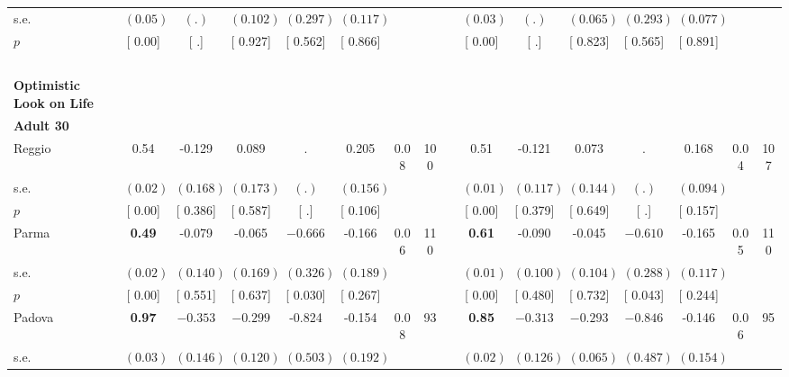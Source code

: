 \begin{longtable}{L{8em} c c c c c c c p{1em} c c c c c c c}
\quad \quad \quad \quad s.e.& $ (     0.05)$ & $ (        .)$ & $ (    0.102)$ & $ (    0.297)$ & $ (    0.117)$ & & & & $ (     0.03)$ & $ (        .)$ & $ (    0.065)$ & $ (    0.293)$ & $ (    0.077)$ & &  \\*
\quad \quad \quad \quad $ p$ & [     0.00] & [        .] & [    0.927] & [    0.562] & [    0.866] & & & & [     0.00] & [        .] & [    0.823] & [    0.565] & [    0.891] & &  \\[1em]
~\\[1em]
\textbf{Optimistic Look on Life} \\*
\quad \quad \textbf{Adult 30} & & & & & & & & & & & & & & & \\* 
\quad \quad \quad Reggio& 0.54 &    -0.129 &     0.089 &         . &     0.205 &      0.08 &       100 & & 0.51 &    -0.121 &     0.073 &         . &     0.168 &      0.04 &       107  \\*
\quad \quad \quad \quad s.e.& $ (     0.02)$ & $ (    0.168)$ & $ (    0.173)$ & $ (        .)$ & $ (    0.156)$ & & & & $ (     0.01)$ & $ (    0.117)$ & $ (    0.144)$ & $ (        .)$ & $ (    0.094)$ & &  \\*
\quad \quad \quad \quad $ p$ & [     0.00] & [    0.386] & [    0.587] & [        .] & [    0.106] & & & & [     0.00] & [    0.379] & [    0.649] & [        .] & [    0.157] & &  \\[1em]
\quad \quad \quad Parma& \textbf{     0.49} &    -0.079 &    -0.065 & $ \mathbf{   -0.666}$ &    -0.166 &      0.06 &       110 & & \textbf{     0.61} &    -0.090 &    -0.045 & $ \mathbf{   -0.610}$ &    -0.165 &      0.05 &       110  \\*
\quad \quad \quad \quad s.e.& $ (     0.02)$ & $ (    0.140)$ & $ (    0.169)$ & $ (    0.326)$ & $ (    0.189)$ & & & & $ (     0.01)$ & $ (    0.100)$ & $ (    0.104)$ & $ (    0.288)$ & $ (    0.117)$ & &  \\*
\quad \quad \quad \quad $ p$ & [     0.00] & [    0.551] & [    0.637] & [    0.030] & [    0.267] & & & & [     0.00] & [    0.480] & [    0.732] & [    0.043] & [    0.244] & &  \\[1em]
\quad \quad \quad Padova& \textbf{     0.97} & $ \mathbf{   -0.353}$ & $ \mathbf{   -0.299}$ &    -0.824 &    -0.154 &      0.08 &        93 & & \textbf{     0.85} & $ \mathbf{   -0.313}$ & $ \mathbf{   -0.293}$ & $ \mathbf{   -0.846}$ &    -0.146 &      0.06 &        95  \\*
\quad \quad \quad \quad s.e.& $ (     0.03)$ & $ (    0.146)$ & $ (    0.120)$ & $ (    0.503)$ & $ (    0.192)$ & & & & $ (     0.02)$ & $ (    0.126)$ & $ (    0.065)$ & $ (    0.487)$ & $ (    0.154)$ & &  \\*

\end{longtable}
